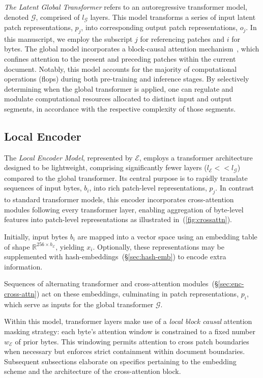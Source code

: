 \textit{The Latent Global Transformer} refers to an autoregressive transformer model, denoted $\mathcal{G}$, comprised of $l_{\mathcal{G}}$ layers. This model transforms a series of input latent patch representations, $p_j$, into corresponding output patch representations, $o_j$. In this manuscript, we employ the subscript $j$ for referencing patches and $i$ for bytes. The global model incorporates a block-causal attention mechanism~\citep{dubey2024llama}, which confines attention to the present and preceding patches within the current document. Notably, this model accounts for the majority of computational operations (flops) during both pre-training and inference stages. By selectively determining when the global transformer is applied, one can regulate and modulate computational resources allocated to distinct input and output segments, in accordance with the respective complexity of those segments.

\subsection{Local Encoder}
\label{section:local}

The \textit{Local Encoder Model}, represented by $\mathcal{E}$, employs a transformer architecture designed to be lightweight, comprising significantly fewer layers ($l_{\mathcal{E}} << l_{\mathcal{G}}$) compared to the global transformer. Its central purpose is to rapidly translate sequences of input bytes, $b_i$, into rich patch-level representations, $p_j$. In contrast to standard transformer models, this encoder incorporates cross-attention modules following every transformer layer, enabling aggregation of byte-level features into patch-level representations as illustrated in~(\autoref{fig:crossattn}).

Initially, input bytes $b_i$ are mapped into a vector space using an embedding table of shape $\mathbb{R}^{256 \times h_{\mathcal{E}}}$, yielding $x_i$. Optionally, these representations may be supplemented with hash-embeddings~(\S\ref{sec:hash-emb}) to encode extra information.

Sequences of alternating transformer and cross-attention modules~(\S\ref{sec:enc-cross-attn}) act on these embeddings, culminating in patch representations, $p_i$, which serve as inputs for the global transformer $\mathcal{G}$.

Within this model, transformer layers make use of a \textit{local block causal} attention masking strategy: each byte’s attention window is constrained to a fixed number $w_{\mathcal{E}}$ of prior bytes. This windowing permits attention to cross patch boundaries when necessary but enforces strict containment within document boundaries. Subsequent subsections elaborate on specifics pertaining to the embedding scheme and the architecture of the cross-attention block.

